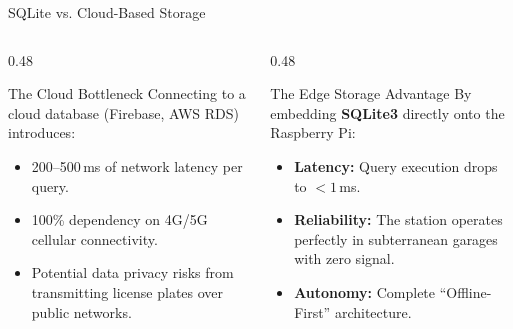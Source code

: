 \documentclass[aspectratio=169,11pt]{beamer}
\begin{document}
\begin{frame}{SQLite vs. Cloud-Based Storage}
\begin{columns}
\begin{column}{0.48\textwidth}
\begin{alertblock}{The Cloud Bottleneck}
Connecting to a cloud database (Firebase, AWS RDS) introduces:
\begin{itemize}
    \item 200--500\,ms of network latency per query.
    \item 100\% dependency on 4G/5G cellular connectivity.
    \item Potential data privacy risks from transmitting license plates over public networks.
\end{itemize}
\end{alertblock}
\end{column}
\begin{column}{0.48\textwidth}
\begin{exampleblock}{The Edge Storage Advantage}
By embedding \textbf{SQLite3} directly onto the Raspberry Pi:
\begin{itemize}
    \item \textbf{Latency:} Query execution drops to $< 1$\,ms.
    \item \textbf{Reliability:} The station operates perfectly in subterranean garages with zero signal.
    \item \textbf{Autonomy:} Complete ``Offline-First'' architecture.
\end{itemize}
\end{exampleblock}
\end{column}
\end{columns}
\end{frame}
\end{document}
